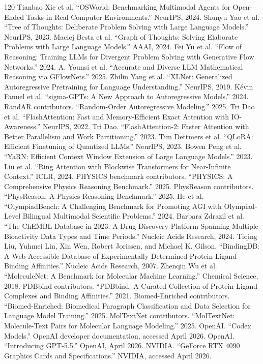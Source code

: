 \documentclass[11pt]{article}
\newcommand{\1}{\mathbf{1}}
\begin{document}
\begin{thebibliography}{120}
 Tianbao Xie et al. ``OSWorld: Benchmarking Multimodal Agents for Open-Ended Tasks in Real Computer Environments.'' NeurIPS, 2024.
 Shunyu Yao et al. ``Tree of Thoughts: Deliberate Problem Solving with Large Language Models.'' NeurIPS, 2023.
 Maciej Besta et al. ``Graph of Thoughts: Solving Elaborate Problems with Large Language Models.'' AAAI, 2024.
 Fei Yu et al. ``Flow of Reasoning: Training LLMs for Divergent Problem Solving with Generative Flow Networks.'' 2024.
 A. Younsi et al. ``Accurate and Diverse LLM Mathematical Reasoning via GFlowNets.'' 2025.
 Zhilin Yang et al. ``XLNet: Generalized Autoregressive Pretraining for Language Understanding.'' NeurIPS, 2019.
 Kévin Fanuel et al. ``sigma-GPTs: A New Approach to Autoregressive Models.'' 2024.
 RandAR contributors. ``Random-Order Autoregressive Modeling.'' 2025.
 Tri Dao et al. ``FlashAttention: Fast and Memory-Efficient Exact Attention with IO-Awareness.'' NeurIPS, 2022.
 Tri Dao. ``FlashAttention-2: Faster Attention with Better Parallelism and Work Partitioning.'' 2023.
 Tim Dettmers et al. ``QLoRA: Efficient Finetuning of Quantized LLMs.'' NeurIPS, 2023.
 Bowen Peng et al. ``YaRN: Efficient Context Window Extension of Large Language Models.'' 2023.
 Liu et al. ``Ring Attention with Blockwise Transformers for Near-Infinite Context.'' ICLR, 2024.
 PHYSICS benchmark contributors. ``PHYSICS: A Comprehensive Physics Reasoning Benchmark.'' 2025.
 PhysReason contributors. ``PhysReason: A Physics Reasoning Benchmark.'' 2025.
 He et al. ``OlympiadBench: A Challenging Benchmark for Promoting AGI with Olympiad-Level Bilingual Multimodal Scientific Problems.'' 2024.
 Barbara Zdrazil et al. ``The ChEMBL Database in 2023: A Drug Discovery Platform Spanning Multiple Bioactivity Data Types and Time Periods.'' Nucleic Acids Research, 2024.
 Tiqing Liu, Yuhmei Lin, Xin Wen, Robert Jorissen, and Michael K. Gilson. ``BindingDB: A Web-Accessible Database of Experimentally Determined Protein-Ligand Binding Affinities.'' Nucleic Acids Research, 2007.
 Zhenqin Wu et al. ``MoleculeNet: A Benchmark for Molecular Machine Learning.'' Chemical Science, 2018.
 PDBbind contributors. ``PDBbind: A Curated Collection of Protein-Ligand Complexes and Binding Affinities.'' 2021.
 Biomed-Enriched contributors. ``Biomed-Enriched: Biomedical Paragraph Classification and Data Selection for Language Model Training.'' 2025.
 MolTextNet contributors. ``MolTextNet: Molecule-Text Pairs for Molecular Language Modeling.'' 2025.
 OpenAI. ``Codex Models.'' OpenAI developer documentation, accessed April 2026.
 OpenAI. ``Introducing GPT-5.5.'' OpenAI, April 2026.
 NVIDIA. ``GeForce RTX 4090 Graphics Cards and Specifications.'' NVIDIA, accessed April 2026.


\end{thebibliography}
\end{document}
